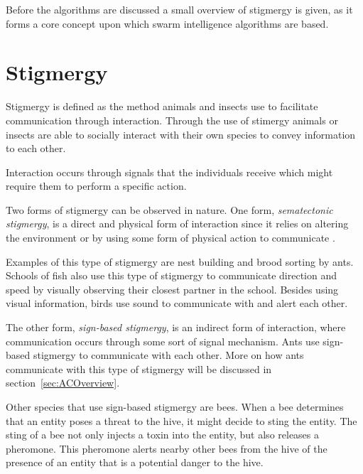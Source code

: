Before the algorithms are discussed a small overview of stigmergy is given, as it forms a core concept upon which swarm intelligence algorithms are based.
\section{Stigmergy}
\label{sec:stigmergy}
Stigmergy is defined as the method animals and insects use to facilitate communication through interaction\cite{AntsAndStigmergy,CompuIntelligenceIntro,AntIntroTrends,FundamentalSwarm}. Through the use of stimergy animals or insects are able to socially interact with their own species to convey information to each other\cite{AntsAndStigmergy,CompuIntelligenceIntro,AntIntroTrends,FundamentalSwarm}.

Interaction occurs through signals that the individuals receive which might require them to perform a specific action\cite{AntsAndStigmergy,CompuIntelligenceIntro,AntIntroTrends}.

Two forms of stigmergy can be observed in nature. One form, \emph{sematectonic stigmergy}\label{def:sematectonic}, is a direct and physical form of interaction since it relies on altering the environment or by using some form of physical action to communicate \cite{CompuIntelligenceIntro}. 

Examples of this type of stigmergy are nest building and brood sorting by ants\cite{CompuIntelligenceIntro}. Schools of fish also use this type of stigmergy to communicate direction and speed by visually observing their closest partner in the school. Besides using visual information, birds use sound to communicate with and alert each other\cite{SwarmArt}.

The other form, \emph{sign-based stigmergy}, is an indirect form of interaction, where communication occurs through some sort of signal mechanism\cite{CompuIntelligenceIntro}. Ants use sign-based stigmergy to communicate with each other. More on how ants communicate with this type of stigmergy will be discussed in section~\ref{sec:ACOverview}.

Other species that use sign-based stigmergy are bees\cite{stigmergicoptimization}. When a bee determines that an entity poses a threat to the hive, it might decide to sting the entity. The sting of a bee not only injects a toxin into the entity, but also releases a pheromone\cite{stigmergicoptimization}. This pheromone alerts nearby other bees from the hive of the presence of an entity that is a potential danger to the hive\cite{stigmergicoptimization}. 

